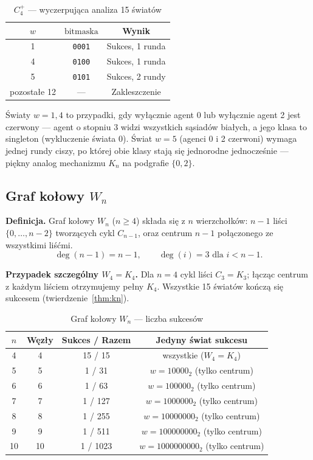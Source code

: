 \documentclass[12pt,a4paper]{article}
\theoremstyle{plain}
\theoremstyle{definition}
\theoremstyle{remark}
\begin{document}
\begin{table}[h]
\centering
\caption{$C_4^+$ — wyczerpująca analiza 15 światów}
\begin{tabular}{ccc}
\toprule
$w$ & $\text{bitmaska}$ & Wynik \\
\midrule
1 & \texttt{0001} & Sukces, 1 runda \\
4 & \texttt{0100} & Sukces, 1 runda \\
5 & \texttt{0101} & Sukces, 2 rundy \\
pozostałe 12 & — & Zakleszczenie \\
\bottomrule
\end{tabular}
\end{table}

Światy $w = 1, 4$ to przypadki, gdy wyłącznie agent 0 lub wyłącznie agent 2 jest czerwony — agent o stopniu 3 widzi wszystkich sąsiadów białych, a jego klasa to singleton (wykluczenie świata 0). Świat $w = 5$ (agenci 0 i 2 czerwoni) wymaga jednej rundy ciszy, po której obie klasy stają się jednorodne jednocześnie — piękny analog mechanizmu $K_n$ na podgrafie $\{0,2\}$.

\subsection{Graf kołowy $W_n$}
\label{sec:wheel}

\textbf{Definicja.} Graf kołowy $W_n$ ($n \ge 4$) składa się z $n$ wierzchołków: $n-1$ liści $\{0,\ldots,n-2\}$ tworzących cykl $C_{n-1}$, oraz centrum $n-1$ połączonego ze wszystkimi liśćmi.
$$\deg(n-1) = n-1, \qquad \deg(i) = 3 \text{ dla } i < n-1.$$

\textbf{Przypadek szczególny $W_4 = K_4$.} Dla $n=4$ cykl liści $C_3 = K_3$; łącząc centrum z każdym liściem otrzymujemy pełny $K_4$. Wszystkie 15 światów kończą się sukcesem (twierdzenie~\ref{thm:kn}).

\begin{table}[H]
\centering
\caption{Graf kołowy $W_n$ — liczba sukcesów}
\begin{tabular}{cccc}
\toprule
$n$ & Węzły & Sukces / Razem & Jedyny świat sukcesu \\
\midrule
4  & 4  & 15 / 15   & wszystkie ($W_4 = K_4$) \\
5  & 5  & 1 / 31    & $w = 10000_2$ (tylko centrum) \\
6  & 6  & 1 / 63    & $w = 100000_2$ (tylko centrum) \\
7  & 7  & 1 / 127   & $w = 1000000_2$ (tylko centrum) \\
8  & 8  & 1 / 255   & $w = 10000000_2$ (tylko centrum) \\
9  & 9  & 1 / 511   & $w = 100000000_2$ (tylko centrum) \\
10 & 10 & 1 / 1023  & $w = 1000000000_2$ (tylko centrum) \\
\bottomrule
\end{tabular}
\end{table}
\end{document}
